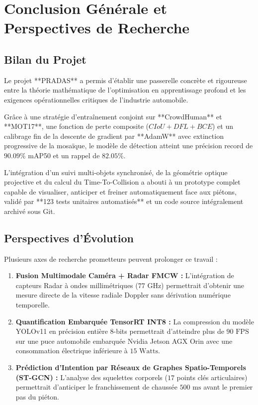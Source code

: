 \documentclass[11pt,a4paper]{article}
\begin{document}
\section{Conclusion Générale et Perspectives de Recherche}

\subsection{Bilan du Projet}
Le projet **PRADAS** a permis d'établir une passerelle concrète et rigoureuse entre la théorie mathématique de l'optimisation en apprentissage profond et les exigences opérationnelles critiques de l'industrie automobile. 

Grâce à une stratégie d'entraînement conjoint sur **CrowdHuman** et **MOT17**, une fonction de perte composite ($CIoU + DFL + BCE$) et un calibrage fin de la descente de gradient par **AdamW** avec extinction progressive de la mosaïque, le modèle de détection atteint une précision record de $\mathbf{90.09\%}$ mAP50 et un rappel de $\mathbf{82.05\%}$. 

L'intégration d'un suivi multi-objets synchronisé, de la géométrie optique projective et du calcul du Time-To-Collision a abouti à un prototype complet capable de visualiser, anticiper et freiner automatiquement face aux piétons, validé par **123 tests unitaires automatisés** et un code source intégralement archivé sous Git.

\subsection{Perspectives d'Évolution}
Plusieurs axes de recherche prometteurs peuvent prolonger ce travail :
\begin{enumerate}
    \item \textbf{Fusion Multimodale Caméra + Radar FMCW :} L'intégration de capteurs Radar à ondes millimétriques ($77\text{ GHz}$) permettrait d'obtenir une mesure directe de la vitesse radiale Doppler sans dérivation numérique temporelle.
    \item \textbf{Quantification Embarquée TensorRT INT8 :} La compression du modèle YOLOv11 en précision entière $8$-bits permettrait d'atteindre plus de $90\text{ FPS}$ sur une puce automobile embarquée Nvidia Jetson AGX Orin avec une consommation électrique inférieure à $15\text{ Watts}$.
    \item \textbf{Prédiction d'Intention par Réseaux de Graphes Spatio-Temporels (ST-GCN) :} L'analyse des squelettes corporels ($17$ points clés articulaires) permettrait d'anticiper le franchissement de chaussée $500\text{ ms}$ avant le premier pas du piéton.
\end{enumerate}
\end{document}
